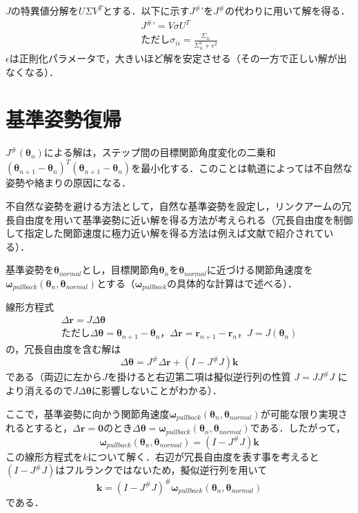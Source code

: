 \documentclass[a4paper,10pt, twocolumn, fleqn]{jsarticle}
\begin{document}
$J$の特異値分解を$U \Sigma V^T$とする．以下に示す$J^\#’$を$J^\#$の代わりに用いて解を得る．
\begin{gather*}
J^\#’ = V \sigma U^T \\
ただし \sigma_{ii} = \frac{\Sigma_{ii}}{\Sigma_{ii}^2 + \epsilon^2}
\end{gather*}
$\epsilon$は正則化パラメータで，大きいほど解を安定させる（その一方で正しい解が出なくなる）．



\section{基準姿勢復帰}

$J^\#(\bm{\theta}_n)$による解は，ステップ間の目標関節角度変化の二乗和$(\bm{\theta}_{n+1} - \bm{\theta}_n)^T(\bm{\theta}_{n+1} - \bm{\theta}_n)$を最小化する．このことは軌道によっては不自然な姿勢や絡まりの原因になる．

不自然な姿勢を避ける方法として，自然な基準姿勢を設定し，リンクアームの冗長自由度を用いて基準姿勢に近い解を得る方法が考えられる（冗長自由度を制御して指定した関節速度に極力近い解を得る方法は例えば文献\cite{gemsjp2012}で紹介されている）．

基準姿勢を$\bm{\theta}_{normal}$とし，目標関節角$\bm{\theta}_n$を$\bm{\theta}_{normal}$に近づける関節角速度を$\bm{\omega}_{pullback}(\bm{\theta}_n, \bm{\theta}_{normal})$とする（$\bm{\omega}_{pullback}$の具体的な計算はで述べる）．

線形方程式
\begin{gather*}
\varDelta\bm{r} = J \varDelta\bm{\theta}\\
ただし \varDelta\bm{\theta} = \bm{\theta}_{n+1} - \bm{\theta}_n，\varDelta\bm{r} = \bm{r}_{n+1} - \bm{r}_n，J=J(\bm{\theta}_n)
\end{gather*}
の，冗長自由度を含む解は
\begin{equation*}
\varDelta\bm{\theta} = J^\# \varDelta\bm{r} + (I - J^\# J)\bm{k}
\end{equation*}
である（両辺に左から$J$を掛けると右辺第二項は擬似逆行列の性質 $J=J J^\# J$ により消えるので$J\varDelta\bm{\theta}$に影響しないことがわかる）．

ここで，基準姿勢に向かう関節角速度$\bm{\omega}_{pullback}(\bm{\theta}_n, \bm{\theta}_{normal})$が可能な限り実現されるとすると，$\varDelta\bm{r}=\bm{0}$のとき$\varDelta\bm{\theta}=\bm{\omega}_{pullback}(\bm{\theta}_n, \bm{\theta}_{normal})$である．したがって，
\begin{equation*}
\bm{\omega}_{pullback}(\bm{\theta}_n, \bm{\theta}_{normal}) = (I - J^\# J)\bm{k}
\end{equation*}
この線形方程式を$k$について解く．右辺が冗長自由度を表す事を考えると$(I - J^\# J)$はフルランクではないため，擬似逆行列を用いて
\begin{equation*}
\bm{k} = (I - J^\# J)^\# \bm{\omega}_{pullback}(\bm{\theta}_n, \bm{\theta}_{normal})
\end{equation*}
である．
\end{document}
